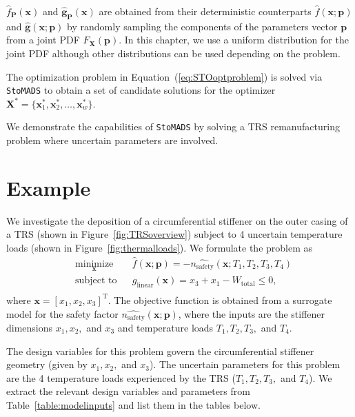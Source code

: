 $\hat{f}_{\mathbf{P}}(\mathbf{x})$ and $\hat{\mathbf{g}}_{\mathbf{P}}(\mathbf{x})$ are obtained from their deterministic counterparts $\hat{f}(\mathbf{x};{\mathbf{p}})$ and $\hat{\mathbf{g}}(\mathbf{x};{\mathbf{p}})$ by randomly sampling the components of the parameters vector $\mathbf{p}$ from a joint \ac{PDF} $F_{\mathbf{X}}(\mathbf{p})$. In this chapter, we use a uniform distribution for the joint \ac{PDF} although other distributions can be used depending on the problem.

The optimization problem in Equation~(\ref{eq:STOoptproblem}) is solved via \texttt{StoMADS} to obtain a set of candidate solutions for the optimizer $\mathbf{X}^*=  \{ \mathbf{x}^*_1,\mathbf{x}^*_2,\ldots,\mathbf{x}^*_w \} $.

We demonstrate the capabilities of \texttt{StoMADS} by solving a \ac{TRS} remanufacturing problem where uncertain parameters are involved.

\section{Example} \label{sec:STOcasestudy}

We investigate the deposition of a circumferential stiffener on the outer casing of a \ac{TRS} (shown in Figure~\ref{fig:TRSoverview}) subject to 4 uncertain temperature loads (shown in Figure~\ref{fig:thermalloads}). We formulate the problem as
%
\begin{equation} \label{eq:Stoproblemdet}
    \begin{aligned}
        & \underset{\mathbf{x}}{\text{minimize}}
        & & \hat{f}(\mathbf{x};\mathbf{p}) = -\hat{n_{\textrm{safety}}}(\mathbf{x};T_1,T_2,T_3,T_4)\\
        & \text{subject to}
        & & {g_{\textrm{linear}}}(\mathbf{x}) = x_3 + x_1 - W_{\textrm{total}} \le 0,\\
    \end{aligned}
\end{equation}
%
where $\mathbf{x} = \left[x_1,x_2,x_3\right]^{\mathrm{T}}$. The objective function is obtained from a surrogate model for the safety factor $\hat{n_{\textrm{safety}}}(\mathbf{x};\mathbf{p})$, where the inputs are the stiffener dimensions $x_1,x_2,$ and $x_3$ and temperature loads $T_1,T_2,T_3,$ and $T_4$.

The design variables for this problem govern the circumferential stiffener geometry (given by $x_1,x_2,$ and $x_3$). The uncertain parameters for this problem are the 4 temperature loads experienced by the \ac{TRS} ($T_1,T_2,T_3,$ and $T_4$). We extract the relevant design variables and parameters from Table~\ref{table:modelinputs} and list them in the tables below.


